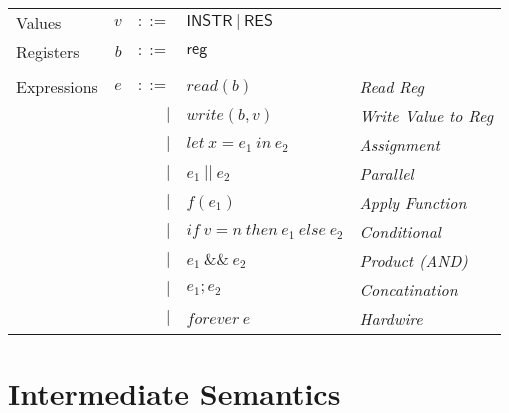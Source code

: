 \documentclass[12pt, letterpaper]{article}
\begin{document}
    \begin{tabular}{l r r l l}
      Values        & $v$     & $::=$     & $\mathsf{INSTR\ |\ RES}$ &\\
      Registers     & $b$     & $::=$     & $\mathsf{reg}$           &\\
      \\
      Expressions & $e$ & $::=$  & $read(b)$       
                        & \textit{Read Reg}\\
                  &     & $\mid$ & $write(b,v)$    
                        & \textit{Write Value to Reg}\\
                  &     & $\mid$ & $let\ x = e_1\ in\ e_2$ 
                        & \textit{Assignment}\\  
                  &     & $\mid$ & $e_1\ ||\ e_2$ 
                        & \textit{Parallel}\\
                  &     & $\mid$ & $f(e_1)$        
                        & \textit{Apply Function} \\  
                  &     & $\mid$ & $if\ v = n\ then\ e_1\ else\ e_2$
                        & \textit{Conditional} \\
                  &     & $\mid$ & $e_1\ \&\&\ e_2$ 
                        & \textit{Product (AND)}\\
                  &     & $\mid$ & $e_1 ; e_2$
                        & \textit{Concatination}\\
                  &     & $\mid$ & $forever\ e$ 
                        & \textit{Hardwire}
    \end{tabular}


  \clearpage
  \section{Intermediate Semantics}\label{sec:icomp}
    
\end{document}
